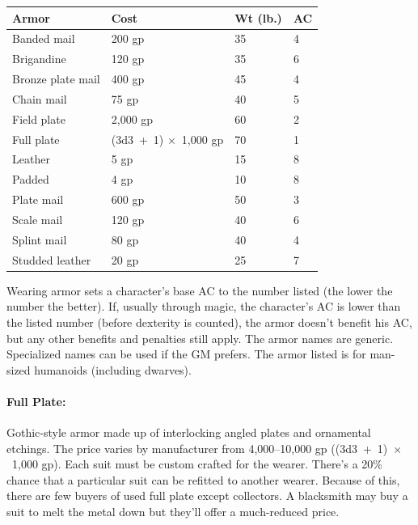 \begin{multicols}{2}
\begin{minipage}{\columnwidth}
\label{armor}
\noindent
\begin{tabular}{|p{}|p{}|p{}|p{}|}
\hline
Armor			& Cost	& Wt (lb.)	& AC \\
\hline\hline
\rowcolor[gray]{.9}Banded mail		& 200 gp	& 35	& 4 \\
Brigandine		& 120 gp	& 35	& 6 \\
\rowcolor[gray]{.9}Bronze plate mail	& 400 gp	& 45	& 4 \\
Chain mail		& 75 gp	& 40	& 5 \\
\rowcolor[gray]{.9}Field plate		& 2,000 gp	& 60	& 2 \\
Full plate		& (3d3~+~1) $\times$~1,000 gp	& 70	& 1 \\
\rowcolor[gray]{.9}Leather			& 5 gp	& 15	& 8 \\
Padded			& 4 gp	& 10	& 8 \\
\rowcolor[gray]{.9}Plate mail		& 600 gp	& 50	& 3 \\
Scale mail		& 120 gp	& 40	& 6 \\
\rowcolor[gray]{.9}Splint mail		& 80 gp	& 40	& 4 \\
Studded leather	& 20 gp	& 25	& 7 \\
\hline
\end{tabular}

\end{minipage}

Wearing armor sets a character's base AC to the number listed (the lower the number the better).  If, usually through magic, the character's AC is lower than the listed number (before dexterity is counted), the armor doesn't benefit his AC, but any other benefits and penalties still apply.  The armor names are generic.  Specialized names can be used if the GM prefers.  The armor listed is for man-sized humanoids (including dwarves).

\paragraph{Full Plate:} Gothic-style armor made up of interlocking angled plates and ornamental etchings.  The price varies by manufacturer from 4,000--10,000 gp ((3d3~+~1)~$\times$~1,000 gp).  Each suit must be custom crafted for the wearer.  There's a 20\% chance that a particular suit can be refitted to another wearer.  Because of this, there are few buyers of used full plate except collectors.  A blacksmith may buy a suit to melt the metal down but they'll offer a much-reduced price.


\end{multicols}
